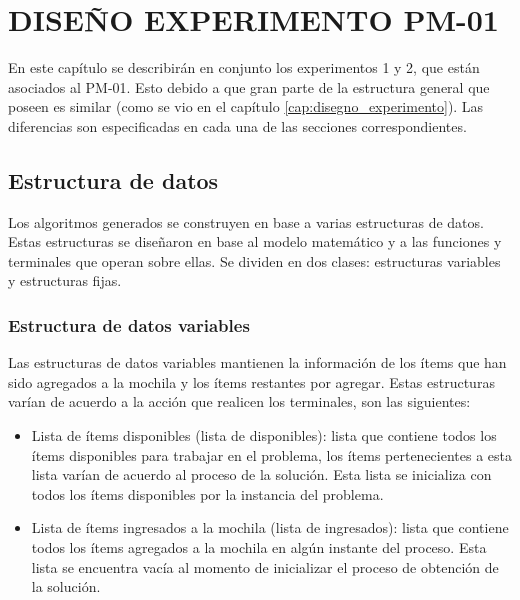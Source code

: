 
\chapter{DISEÑO EXPERIMENTO PM-01}
\label{cap:disegno_pm01}


En este capítulo se describirán en conjunto los experimentos 1 y 2, que están asociados al PM-01. Esto debido a que gran parte de la estructura general que poseen es similar (como se vio en el capítulo \ref{cap:disegno_experimento}). Las diferencias son especificadas en cada una de las secciones correspondientes.

\section{Estructura de datos}

Los algoritmos generados se construyen en base a varias estructuras de datos. Estas estructuras se diseñaron en base al modelo matemático y a las funciones y terminales que operan sobre ellas. Se dividen en dos clases: estructuras variables y estructuras fijas.

\subsection{Estructura de datos variables}

Las estructuras de datos variables mantienen la información de los ítems que han sido agregados a la mochila y los ítems restantes por agregar. Estas estructuras varían de acuerdo a la acción que realicen los terminales, son las siguientes:

\begin{itemize}
	\item Lista de ítems disponibles (lista de disponibles): lista que contiene todos los ítems disponibles para trabajar en el problema, los ítems pertenecientes a esta lista varían de acuerdo al proceso de la solución. Esta lista se inicializa con todos los ítems disponibles por la instancia del problema.
	\item Lista de ítems ingresados a la mochila (lista de ingresados): lista que contiene todos los ítems agregados a la mochila en algún instante del proceso. Esta lista se encuentra vacía al momento de inicializar el proceso de obtención de la solución.
\end{itemize}

